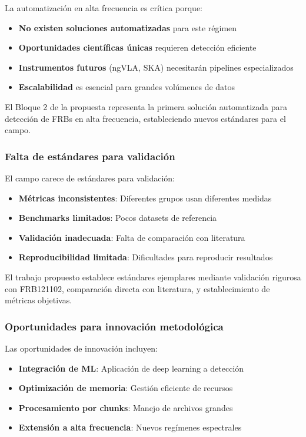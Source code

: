 La automatización en alta frecuencia es crítica porque:

\begin{itemize}
    \item \textbf{No existen soluciones automatizadas} para este régimen
    \item \textbf{Oportunidades científicas únicas} requieren detección eficiente
    \item \textbf{Instrumentos futuros} (ngVLA, SKA) necesitarán pipelines especializados
    \item \textbf{Escalabilidad} es esencial para grandes volúmenes de datos
\end{itemize}

El Bloque 2 de la propuesta representa la primera solución automatizada para detección de FRBs en alta frecuencia, estableciendo nuevos estándares para el campo.

\subsubsection{Falta de estándares para validación}

El campo carece de estándares para validación:

\begin{itemize}
    \item \textbf{Métricas inconsistentes}: Diferentes grupos usan diferentes medidas
    \item \textbf{Benchmarks limitados}: Pocos datasets de referencia
    \item \textbf{Validación inadecuada}: Falta de comparación con literatura
    \item \textbf{Reproducibilidad limitada}: Dificultades para reproducir resultados
\end{itemize}

El trabajo propuesto establece estándares ejemplares mediante validación rigurosa con FRB121102, comparación directa con literatura, y establecimiento de métricas objetivas.

\subsubsection{Oportunidades para innovación metodológica}

Las oportunidades de innovación incluyen:

\begin{itemize}
    \item \textbf{Integración de ML}: Aplicación de deep learning a detección
    \item \textbf{Optimización de memoria}: Gestión eficiente de recursos
    \item \textbf{Procesamiento por chunks}: Manejo de archivos grandes
    \item \textbf{Extensión a alta frecuencia}: Nuevos regímenes espectrales
\end{itemize}

